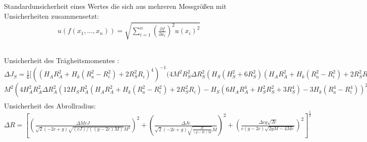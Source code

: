 Standardunsicherheit eines Wertes die sich aus mehreren Messgrößen mit Unsicherheiten zusammensetzt:
\begin{align}
	u(f(x_1,...,x_n))=\sqrt{\sum_{i=1}^{n}\left(\frac{\partial f}{\partial x_i}\right)^2 u(x_i)^2}
	\label{eq:suw}
\end{align}
\subsection*{}
Unsicherheit des Trägheitsmomentes :\\
$\Delta J_S= \frac{1}{6} [ ((H_{A} R_{A}^{2} + H_{k} (R_{a}^{2} - R_{i}^{2}) + 2 R_{S}^{2} R_{i})^{4})^{-1} (4 M^{2} R_{S}^{2} \Delta R_{S}^{2} (H_{S} (H_{S}^{2} + 6 R_{S}^{2}) (H_{A} R_{A}^{2} + H_{k} (R_{a}^{2} - R_{i}^{2}) + 2 R_{S}^{2} R_{i}) - 2 R_{i} (H_{S} (6 H_{A} R_{A}^{4} + H_{S}^{2} R_{S}^{2} + 3 R_{S}^{4}) + 3 H_{k} (R_{a}^{4} - R_{i}^{4})))^{2} +$\\
$M^{2} (4 H_{A}^{2} R_{A}^{2} \Delta R_{A}^{2} (12 H_{S} R_{A}^{2} (H_{A} R_{A}^{2} + H_{k} (R_{a}^{2} - R_{i}^{2}) + 2 R_{S}^{2} R_{i}) - H_{S} (6 H_{A} R_{A}^{4} + H_{S}^{2} R_{S}^{2} + 3 R_{S}^{4}) - 3 H_{k} (R_{a}^{4} - R_{i}^{4}))^{2} + 4 H_{k}^{2} R_{a}^{2} \Delta R_{a}^{2} (- H_{S} (6 H_{A} R_{A}^{4} + H_{S}^{2} R_{S}^{2} + 3 R_{S}^{4}) - 3 H_{k} (R_{a}^{4} - R_{i}^{4}) + 6 R_{a}^{2} (H_{A} R_{A}^{2} + H_{k} (R_{a}^{2} - R_{i}^{2}) + 2 R_{S}^{2} R_{i}))^{2} + R_{A}^{4} \Delta H_{A}^{2} (6 H_{S} R_{A}^{2} (H_{A} R_{A}^{2} + H_{k} (R_{a}^{2} - R_{i}^{2}) + 2 R_{S}^{2} R_{i}) - H_{S}  (6 H_{A} R_{A}^{4} + H_{S}^{2} R_{S}^{2} + 3 R_{S}^{4} ) - 3 H_{k}  (R_{a}^{4} - R_{i}^{4} ) )^{2} + \Delta H_{k}^{2}  ( (R_{a}^{2} - R_{i}^{2} )  (H_{S}  (6 H_{A} R_{A}^{4} + H_{S}^{2} R_{S}^{2} + 3 R_{S}^{4} ) + 3 H_{k}  (R_{a}^{4} - R_{i}^{4} ) ) - 3  (R_{a}^{4} - R_{i}^{4} )  (H_{A} R_{A}^{2} + H_{k}  (R_{a}^{2} - R_{i}^{2} ) + 2 R_{S}^{2} R_{i} ) )^{2} + \Delta R_{i}^{2}  (12.0 H_{k} R_{i}^{3}  (H_{A} R_{A}^{2} + H_{k}  (R_{a}^{2} - R_{i}^{2} ) + 2 R_{S}^{2} R_{i} ) - 2  (H_{S}  (6 H_{A} R_{A}^{4} + H_{S}^{2} R_{S}^{2} + 3 R_{S}^{4} ) + 3 H_{k}  (R_{a}^{4} - R_{i}^{4} ) )  (H_{k} R_{i} - R_{S}^{2} ) )^{2} ) +  (9 M^{2} \Delta H_{S}^{2}  (2 H_{A} R_{A}^{4} + H_{S}^{2} R_{S}^{2} + R_{S}^{4} )^{2} + \Delta M^{2}  (H_{S}  (6 H_{A} R_{A}^{4} + H_{S}^{2} R_{S}^{2} + 3 R_{S}^{4} ) + 3 H_{k}  (R_{a}^{4} - R_{i}^{4} ) )^{2} )  (H_{A} R_{A}^{2} + H_{k}  (R_{a}^{2} - R_{i}^{2} ) + 2 R_{S}^{2} R_{i} )^{2} )  ]^{\frac{1}{2}} $
\begin{align}
\label{eq:uJfall}
\end{align}
Unsicherheit des Abrollradius:\\
$
\Delta R =\left[ 
(\frac{\Delta M c J}{\sqrt{2} (-2 c+g) \sqrt{(c J)/((g-2c) M)} M^2})^2
+(\frac{\Delta J c}{\sqrt{2} (-2 c+g) \sqrt{\frac{J c}{(g-2c) M}} M})^2
+(\frac{\Delta c g \sqrt{J c}}{ c (g-2 c)\sqrt{2 g M-4 M c}})^2 
\right]^{\frac{1}{2}}	
$
\begin{align}
	\label{eq:uR}
\end{align}







